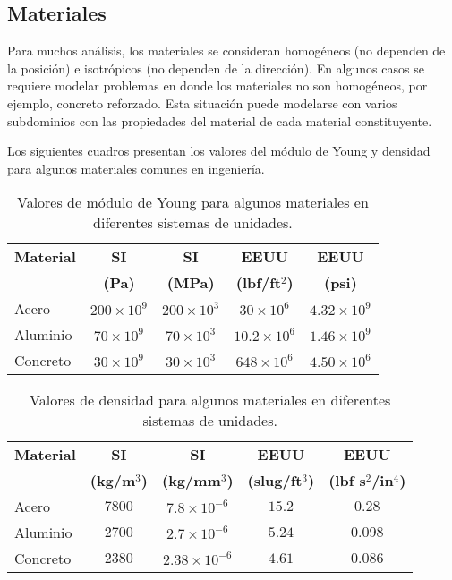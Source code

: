 \subsection{Materiales}
Para muchos análisis, los materiales se consideran homogéneos (no dependen de la posición) e isotrópicos (no dependen de la dirección). En algunos casos se requiere  modelar problemas en donde los materiales no son homogéneos, por ejemplo, concreto reforzado. Esta situación puede modelarse con varios subdominios con las propiedades del material de cada material constituyente.

Los siguientes cuadros presentan los valores del módulo de Young y densidad para algunos materiales comunes en ingeniería.
\begin{table}[h]
\centering
\begin{tabular}{lcccc}
\hline 
\textbf{Material} & \textbf{SI}  & \textbf{SI} & \textbf{EEUU} & \textbf{EEUU} \\
   & \textbf{(Pa)}  & \textbf{(MPa)} & \textbf{(lbf/ft$^2$)} & \textbf{(psi)} \\ 
\hline
Acero   &$200\times 10^9$ &$200\times 10^3$ &$30\times 10^6$ &$4.32\times 10^9$\\
Aluminio &$70\times 10^9$ &$70 \times 10^3$ &$10.2 \times 10^6$ &$1.46 \times 10^9$\\
Concreto & $30\times 10^9$ &$30\times 10^3$ &$648\times 10^6$ &$4.50\times 10^6$\\
\hline 
\end{tabular}
\caption{Valores de módulo de Young para algunos materiales en diferentes sistemas de unidades.}
\end{table}
\begin{table}[h]
\centering
\begin{tabular}{lcccc}
\hline 
\textbf{Material} & \textbf{SI}  & \textbf{SI} & \textbf{EEUU} & \textbf{EEUU} \\
 & \textbf{(kg/m$^3$)}  & \textbf{(kg/mm$^3$)} & \textbf{(slug/ft$^3$)} & \textbf{(lbf s$^2$/in$^4$)} \\ 
\hline
Acero   &$7800$ &$7.8 \times 10^{-6}$ &$15.2$ &$0.28$\\
Aluminio &$2700$ &$2.7 \times 10^{-6}$ &$5.24$ &$0.098$\\
Concreto & $2380$ &$2.38 \times 10^{-6}$ &$4.61$ &$0.086$\\
\hline 
\end{tabular}
\caption{Valores de densidad para algunos materiales en diferentes sistemas de unidades.}
\end{table}



